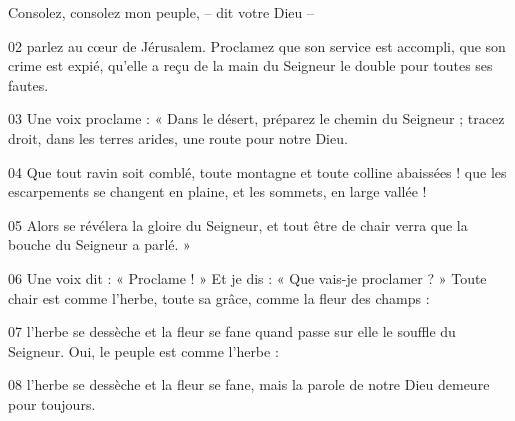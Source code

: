 Consolez, consolez mon peuple, – dit votre Dieu –

02 parlez au cœur de Jérusalem. Proclamez que son service est accompli, que son crime est expié, qu’elle a reçu de la main du Seigneur le double pour toutes ses fautes.

03 Une voix proclame : « Dans le désert, préparez le chemin du Seigneur ; tracez droit, dans les terres arides, une route pour notre Dieu.

04 Que tout ravin soit comblé, toute montagne et toute colline abaissées ! que les escarpements se changent en plaine, et les sommets, en large vallée !

05 Alors se révélera la gloire du Seigneur, et tout être de chair verra que la bouche du Seigneur a parlé. »

06 Une voix dit : « Proclame ! » Et je dis : « Que vais-je proclamer ? » Toute chair est comme l’herbe, toute sa grâce, comme la fleur des champs :

07 l’herbe se dessèche et la fleur se fane quand passe sur elle le souffle du Seigneur. Oui, le peuple est comme l’herbe :

08 l’herbe se dessèche et la fleur se fane, mais la parole de notre Dieu demeure pour toujours.